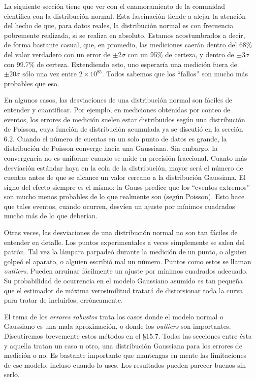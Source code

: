 \documentclass[10pt,a4paper]{book}
\begin{document}
La siguiente sección tiene que ver con el enamoramiento de la comunidad científica con la distribución normal. Esta fascinación tiende a alejar la atención del hecho de que, para datos reales, la distribución normal es con frecuencia pobremente realizada, si se realiza en absoluto. Estamos acostumbrados a decir, de forma bastante casual, que, en promedio, las mediciones caerán dentro del 68\% del valor verdadero con un error de $\pm 2\sigma$ con un 95\% de certeza, y dentro de $\pm 3\sigma$ con 99.7\% de certeza. Extendiendo esto, uno esperaría una medición fuera de $\pm 20\sigma$ sólo una vez entre $2 \times 10^{85}$. Todos sabemos que los ``fallos'' son mucho más probables que eso.

En algunos casos, las desviaciones de una distribución normal son fáciles de entender y cuantificar. Por ejemplo, en mediciones obtenidas por conteo de eventos, los errores de medición suelen estar distribuidos según una distribución de Poisson, cuya función de distribución acumulada ya se discutió en la sección 6.2. Cuando el número de cuentas en un solo punto de datos es grande, la distribución de Poisson converge hacia una Gaussiana. Sin embargo, la convergencia no es uniforme cuando se mide en precisión fraccional. Cuanto más desviación estándar haya en la cola de la distribución, mayor será el número de cuentas antes de que se alcance un valor cercano a la distribución Gaussiana. El signo del efecto siempre es el mismo: la Gauss predice que los ``eventos extremos'' son mucho menos probables de lo que realmente son (según Poisson). Esto hace que tales eventos, cuando ocurren, desvíen un ajuste por mínimos cuadrados mucho más de lo que deberían.

Otras veces, las desviaciones de una distribución normal no son tan fáciles de entender en detalle. Los puntos experimentales a veces simplemente se salen del patrón. Tal vez la lámpara parpadeó durante la medición de un punto, o alguien golpeó el aparato, o alguien escribió mal un número. Puntos como estos se llaman \textit{outliers}. Pueden arruinar fácilmente un ajuste por mínimos cuadrados adecuado. Su probabilidad de ocurrencia en el modelo Gaussiano asumido es tan pequeña que el estimador de máxima verosimilitud tratará de distorsionar toda la curva para tratar de incluirlos, erróneamente.

El tema de los \textit{errores robustos} trata los casos donde el modelo normal o Gaussiano es una mala aproximación, o donde los \textit{outliers} son importantes. Discutiremos brevemente estos métodos en el \S15.7. Todas las secciones entre ésta y aquella tratan un caso u otro, una distribución Gaussiana para los errores de medición o no. Es bastante importante que mantengas en mente las limitaciones de ese modelo, incluso cuando lo uses. Los resultados pueden parecer buenos sin serlo.
\end{document}
